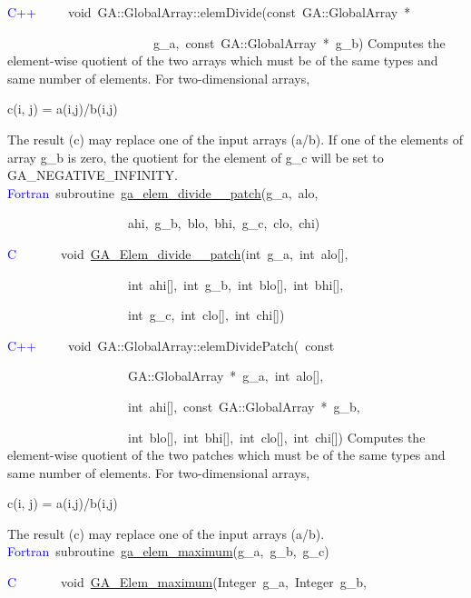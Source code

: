 \textcolor{blue}{C++}~~~~~void~GA::GlobalArray::elemDivide(const~GA::GlobalArray~{*}~

~~~~~~~~~~~~~~~~~~~~~~~g\_a,~const~GA::GlobalArray~{*}~g\_b)
Computes the element-wise quotient of the two arrays which must be
of the same types and same number of elements. For two-dimensional
arrays,

c(i, j) = a(i,j)/b(i,j)

The result (c) may replace one of the input arrays (a/b). If one of
the elements of array g\_b is zero, the quotient for the element of
g\_c will be set to GA\_NEGATIVE\_INFINITY. 
\textcolor{blue}{Fortran}~subroutine~\href{http://www.emsl.pnl.gov/docs/global/ga_ops.html\#ga_elem_divide_patch}{ga\_{}elem\_{}divide\_{}\_{}patch}(g\_a,~alo,~

~~~~~~~~~~~~~~~~~~~ahi,~g\_b,~blo,~bhi,~g\_c,~clo,~chi)~

\textcolor{blue}{C}~~~~~~~void~\href{http://www.emsl.pnl.gov/docs/global/c_nga_ops.html\#ga_elem_divide_patch}{GA\_{}Elem\_{}divide\_{}\_{}patch}(int~g\_a,~int~alo{[}{]},

~~~~~~~~~~~~~~~~~~~int~ahi{[}{]},~int~g\_b,~int~blo{[}{]},~int~bhi{[}{]},~

~~~~~~~~~~~~~~~~~~~int~g\_c,~int~clo{[}{]},~int~chi{[}{]})~

\textcolor{blue}{C++}~~~~~void~GA::GlobalArray::elemDividePatch(~const~

~~~~~~~~~~~~~~~~~~~GA::GlobalArray~{*}~g\_a,~int~alo{[}{]},~

~~~~~~~~~~~~~~~~~~~int~ahi{[}{]},~const~GA::GlobalArray~{*}~g\_b,~

~~~~~~~~~~~~~~~~~~~int~blo{[}{]},~int~bhi{[}{]},~int~clo{[}{]},~int~chi{[}{]})
Computes the element-wise quotient of the two patches which must be
of the same types and same number of elements. For two-dimensional
arrays,

c(i, j) = a(i,j)/b(i,j)

The result (c) may replace one of the input arrays (a/b). 
\textcolor{blue}{Fortran}~subroutine~\href{http://www.emsl.pnl.gov/docs/global/ga_ops.html\#ga_elem_maximum}{ga\_{}elem\_{}maximum}(g\_a,~g\_b,~g\_c)~

\textcolor{blue}{C}~~~~~~~void~\href{http://www.emsl.pnl.gov/docs/global/c_nga_ops.html\#ga_elem_maximum}{GA\_{}Elem\_{}maximum}(Integer~g\_a,~Integer~g\_b,~

